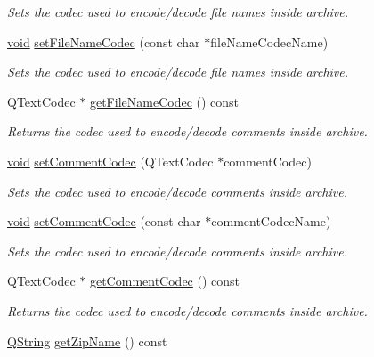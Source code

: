 \begin{DoxyCompactItemize}
\begin{DoxyCompactList}\small\item\em Sets the codec used to encode/decode file names inside archive. \end{DoxyCompactList}\item 
\hyperlink{group___u_a_v_objects_plugin_ga444cf2ff3f0ecbe028adce838d373f5c}{void} \hyperlink{class_qua_zip_a8f283519a195aa1d9076bbbb01ea0497}{set\-File\-Name\-Codec} (const char $\ast$file\-Name\-Codec\-Name)
\begin{DoxyCompactList}\small\item\em Sets the codec used to encode/decode file names inside archive. \end{DoxyCompactList}\item 
Q\-Text\-Codec $\ast$ \hyperlink{class_qua_zip_ac08a895376535a8860b9d5accd52e247}{get\-File\-Name\-Codec} () const 
\begin{DoxyCompactList}\small\item\em Returns the codec used to encode/decode comments inside archive. \end{DoxyCompactList}\item 
\hyperlink{group___u_a_v_objects_plugin_ga444cf2ff3f0ecbe028adce838d373f5c}{void} \hyperlink{class_qua_zip_a1c81fca7215a4374f6f03872ade4885b}{set\-Comment\-Codec} (Q\-Text\-Codec $\ast$comment\-Codec)
\begin{DoxyCompactList}\small\item\em Sets the codec used to encode/decode comments inside archive. \end{DoxyCompactList}\item 
\hyperlink{group___u_a_v_objects_plugin_ga444cf2ff3f0ecbe028adce838d373f5c}{void} \hyperlink{class_qua_zip_a413f3c56b54a9a47258d53802cb606e7}{set\-Comment\-Codec} (const char $\ast$comment\-Codec\-Name)
\begin{DoxyCompactList}\small\item\em Sets the codec used to encode/decode comments inside archive. \end{DoxyCompactList}\item 
Q\-Text\-Codec $\ast$ \hyperlink{class_qua_zip_a25a8d6963e62eaff007569001e8715c4}{get\-Comment\-Codec} () const 
\begin{DoxyCompactList}\small\item\em Returns the codec used to encode/decode comments inside archive. \end{DoxyCompactList}\item 
\hyperlink{group___u_a_v_objects_plugin_gab9d252f49c333c94a72f97ce3105a32d}{Q\-String} \hyperlink{class_qua_zip_a4f7deef08ff40aeb1a7a04bcd7f228c2}{get\-Zip\-Name} () const 

\end{DoxyCompactItemize}
